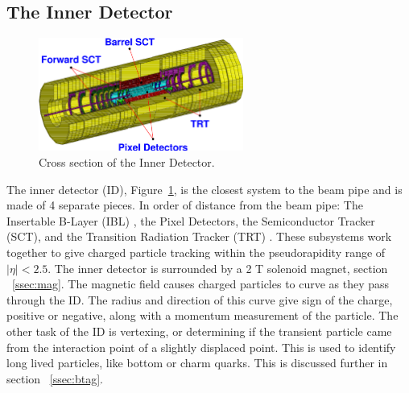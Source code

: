 \subsection{The Inner Detector}
\begin{figure}[h]
\begin{center}
\includegraphics*[width=0.60\textwidth] {figures/inner_3D}%
\caption[Cross section of the Inner Detector.]{Cross section of the Inner Detector.}
\label{fig:ID_cs}
\end{center}
\end{figure}
%
%
The inner detector (ID), Figure~\ref{fig:ID_cs}, is the closest system to the beam pipe and is made of 4 separate pieces. In order of distance from the beam pipe: The Insertable B-Layer (IBL) \cite{Capeans:1291633}, the Pixel Detectors, the Semiconductor Tracker (SCT), and the Transition Radiation Tracker (TRT) \cite{CERN-LHCC-97-016}. These subsystems work together to give charged particle tracking within the pseudorapidity range of ${|\eta| < 2.5}$. The inner detector is surrounded by a 2 T solenoid magnet, section ~\ref{ssec:mag}. The magnetic field causes charged particles to curve as they pass through the ID. The radius and direction of this curve give sign of the charge, positive or negative, along with a momentum measurement of the particle. The other task of the ID is vertexing, or determining if the transient particle came from the interaction point of a slightly displaced point. This is used to identify long lived particles, like bottom or charm quarks. This is discussed further in section ~\ref{ssec:btag}. \linebreak
